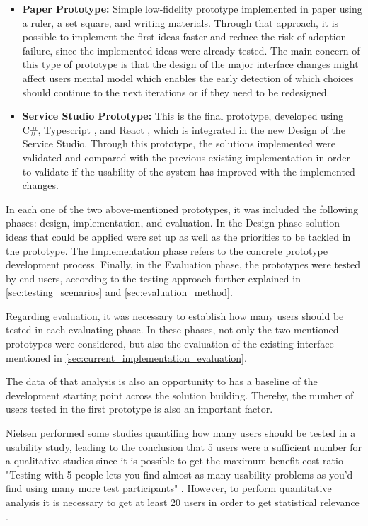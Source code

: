 \begin{itemize}
    \item \textbf{Paper Prototype: } Simple low-fidelity prototype implemented in paper using a ruler, a set square, and writing materials. Through that approach, it is possible to implement the first ideas faster and reduce the risk of adoption failure, since the implemented ideas were already tested. The main concern of this type of prototype is that the design of the major interface changes might affect users mental model which enables the early detection of which choices should continue to the next iterations or if they need to be redesigned.
    \item \textbf{Service Studio Prototype: } This is the final prototype, developed using C\#, Typescript \cite{typescript}, and React \cite{react}, which is integrated in the new Design of the Service Studio. Through this prototype, the solutions implemented were validated and compared with the previous existing implementation in order to validate if the usability of the system has improved with the implemented changes.
\end{itemize}

In each one of the two above-mentioned prototypes, it was included the following phases: design, implementation, and evaluation. In the Design phase solution ideas that could be applied were set up as well as the priorities to be tackled in the prototype. The Implementation phase refers to the concrete prototype development process. Finally, in the Evaluation phase, the prototypes were tested by end-users, according to the testing approach further explained in \ref{sec:testing_scenarios} and \ref{sec:evaluation_method}.

Regarding evaluation, it was necessary to establish how many users should be tested in each evaluating phase. In these phases, not only the two mentioned prototypes were considered, but also the evaluation of the existing interface mentioned in \ref{sec:current_implementation_evaluation}. 

The data of that analysis is also an opportunity to has a baseline of the development starting point across the solution building. Thereby, the number of users tested in the first prototype is also an important factor.

Nielsen performed some studies quantifing how many users should be tested in a usability study, leading to the conclusion that 5 users were a sufficient number for a qualitative studies since it is possible to get the maximum benefit-cost ratio - "Testing with 5 people lets you find almost as many usability problems as you'd find using many more test participants" \cite{why_you_only_need_to_test_with_5_users} \cite{how_many_test_users_in_a_usability_study}. However, to perform quantitative analysis it is necessary to get at least 20 users in order to get statistical relevance \cite{how_many_test_users_in_a_usability_study}.

